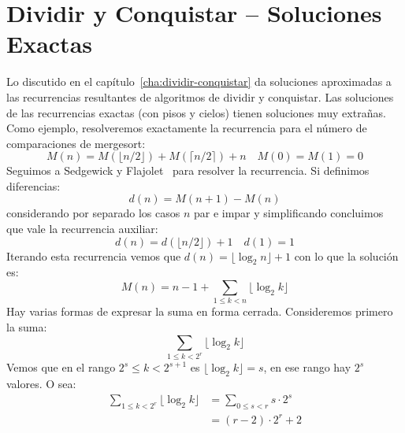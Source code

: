 

\chapter{Dividir y Conquistar -- Soluciones Exactas}
\label{cha:dividir-conquistar-solucion}

  Lo discutido en el capítulo~\ref{cha:dividir-conquistar}
  da soluciones aproximadas a las recurrencias resultantes
  de algoritmos de dividir y conquistar.
  Las soluciones de las recurrencias exactas
  (con pisos y cielos)
  tienen soluciones muy extrañas.
  Como ejemplo,
  resolveremos exactamente la recurrencia
  para el número de comparaciones de mergesort:
  \begin{equation}
    \label{eq:mergesort-exact}
    M(n)
      = M(\lfloor n / 2 \rfloor)
          + M(\lceil n / 2 \rceil)
          + n
    \quad
    M(0)
      = M(1)
      = 0
  \end{equation}
  Seguimos a Sedgewick y Flajolet~%
    \cite{sedgewick13:_introd_anal_algor}
  para resolver la recurrencia.
  Si definimos diferencias:
  \begin{equation*}
    d(n)
      = M(n + 1) - M(n)
  \end{equation*}
  considerando por separado los casos \(n\) par e impar y simplificando
  concluimos que vale la recurrencia auxiliar:
  \begin{equation*}
    d(n)
      = d(\lfloor n / 2 \rfloor) + 1
    \quad
    d(1)
      = 1
  \end{equation*}
  Iterando esta recurrencia vemos que \(d(n) = \lfloor \log_2 n \rfloor + 1\)
  con lo que la solución es:
  \begin{equation}
    \label{eq:mergesort-interim}
    M(n)
      = n - 1 + \sum_{1 \le k < n} \lfloor \log_2 k \rfloor
  \end{equation}
  Hay varias formas de expresar la suma en forma cerrada.
  Consideremos primero la suma:
  \begin{equation*}
    \sum_{1 \le k < 2^r} \lfloor \log_2 k \rfloor
  \end{equation*}
  Vemos que en el rango \(2^s \le k < 2^{s + 1}\)
  es \(\lfloor \log_2 k \rfloor = s\),
  en ese rango hay \(2^s\) valores.
  O sea:
  \begin{align*}
    \sum_{1 \le k < 2^r} \lfloor \log_2 k \rfloor
      &= \sum_{0 \le s < r} s \cdot 2^s \\
      &= (r - 2) \cdot 2^r + 2
  \end{align*}
